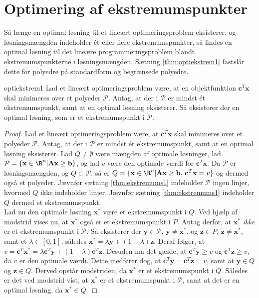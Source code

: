 \section{Optimering af ekstremumspunkter}
%
Så længe en optimal løsning til et lineært optimeringsproblem eksisterer, og løsningsmængden indeholder ét eller flere ekstremumspunkter, så findes en optimal løsning til det lineære programmeringsproblem blandt ekstremumspunkterne i løsningsmængden. 
Sætning \ref{thm:optiekstrem1} fastslår dette for polyedre på standardform og begrænsede polyedre. 
%
\begin{thm}{}{optiekstrem1}
Lad et lineært optimeringsproblem være, at en objektfunktion $\textbf{c}^T \textbf{x}$ skal minimeres over et polyeder $\mathcal{P}$. 
Antag, at der i $\mathcal{P}$ er mindst ét ekstremumspunkt, samt at en optimal løsning eksisterer. 
Så eksisterer der en optimal løsning, som er et ekstremumspunkt i $\mathcal{P}$.
\end{thm}
%
%
\begin{proof}
Lad et lineært optimeringsproblem være, at $\textbf{c}^T \textbf{x}$ skal minimeres over et polyeder $\mathcal{P}$. 
Antag, at der i $\mathcal{P}$ er mindst ét ekstremumspunkt, samt at en optimal løsning eksisterer. 
Lad $Q \neq \emptyset $ være mængden af optimale løsninger, lad $\mathcal{P} = \{\textbf{x} \in \R^n | \textbf{A}\textbf{x} \geq \textbf{b} \}$, og lad $v$ være den optimale værdi for $\textbf{c}^T \textbf{x}$. 
Da $\mathcal{P}$ er løsningsmængden, og $Q \subset \mathcal{P}$, så er $Q = \{\textbf{x} \in \R^n | \textbf{A}\textbf{x} \geq \textbf{b} \text{, } \textbf{c}^T \textbf{x} = v \}$ og dermed også et polyeder. 
Jævnfør sætning \ref{thm:ekstremums1} indeholder $\mathcal{P}$ ingen linjer, hvormed $Q$ ikke indeholder linjer. 
Jævnfør sætning \ref{thm:ekstremums1} indeholder $Q$ dermed et ekstremumspunkt. \\
Lad nu den optimale løsning $\textbf{x}^*$ være et ekstremumspunkt i $Q$. 
Ved hjælp af modstrid vises nu, at $\textbf{x}^*$ også er et ekstremumspunkt i $P$. 
Antag derfor, at $\textbf{x}^*$ \textit{ikke} er et ekstremumspunkt i $\mathcal{P}$. 
Så eksisterer der $\textbf{y} \in \mathcal{P}$, $\textbf{y} \neq \textbf{x}^*$, og $\textbf{z} \in P$, $\textbf{z} \neq \textbf{x}^*$, samt et $\lambda \in [0,1]$, således $ \textbf{x}^* = \lambda \textbf{y} + (1 - \lambda) \textbf{z}$. 
Deraf følger, at $v = \textbf{c}^T \textbf{x}^* =  \lambda \textbf{c}^T \textbf{y} + (1 - \lambda) \textbf{c}^T \textbf{z}$. 
Desuden må det gælde, at $\textbf{c}^T \textbf{y} \geq v$ og $\textbf{c}^T \textbf{z} \geq v$, da $v$ er den optimale værdi. 
Dette medfører dog, at $ \textbf{c}^T \textbf{y} = \textbf{c}^T \textbf{z} = v$, samt at $\textbf{y} \in Q$ og $\textbf{z} \in Q$. 
Derved opstår modstriden, da $\textbf{x}^*$ er et ekstremumspunkt i $Q$. 
Således er det ved modstrid vist, at $\textbf{x}^*$ er et ekstremumspunkt i $\mathcal{P}$, samt at det er en optimal løsning, da $\textbf{x}^* \in Q$. 
\end{proof}\\
